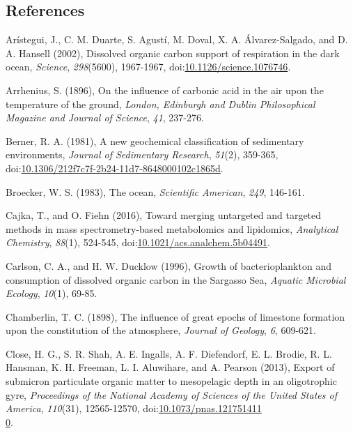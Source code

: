 \begin{singlespace}
\section*{References}
\addtocounter{section}{1}
{\setlength{\parindent}{0pt}
Ar\'{i}stegui, J., C. M. Duarte, S. Agust\'{i}, M. Doval, X. A. \'{A}lvarez-Salgado,
and D. A. Hansell (2002), Dissolved organic carbon support of
respiration in the dark ocean, \emph{Science}, \emph{298}(5600),
1967-1967, doi:\href{http://dx.doi.org/10.1126/science.1076746}{10.1126/science.1076746}.

{\setlength{\parskip}{10pt}

Arrhenius, S. (1896), On the influence of carbonic acid in the air upon the temperature of the ground, \emph{London, Edinburgh and Dublin Philosophical Magazine and Journal of Science}, \emph{41}, 237-276.

Berner, R. A. (1981), A new geochemical classification of sedimentary
environments, \emph{Journal of Sedimentary Research}, \emph{51}(2),
359-365, doi:\href{http://dx.doi.org/10.1306/212f7c7f-2b24-11d7-8648000102c1865d}{10.1306/212f7c7f-2b24-11d7-8648000102c1865d}.

Broecker, W. S. (1983), The ocean, \emph{Scientific American}, \emph{249}, 146-161.

Cajka, T., and O. Fiehn (2016), Toward merging untargeted and targeted
methods in mass spectrometry-based metabolomics and lipidomics,
\emph{Analytical Chemistry}, \emph{88}(1), 524-545,
doi:\href{http://dx.doi.org/10.1021/acs.analchem.5b04491}{10.1021/acs.analchem.5b04491}.

Carlson, C. A., and H. W. Ducklow (1996), Growth of bacterioplankton and
consumption of dissolved organic carbon in the Sargasso Sea,
\emph{Aquatic Microbial Ecology}, \emph{10}(1), 69-85.

Chamberlin, T. C. (1898), The influence of great epochs of limestone formation upon the constitution of the atmosphere, \emph{Journal of Geology}, \emph{6}, 609-621.

Close, H. G., S. R. Shah, A. E. Ingalls, A. F. Diefendorf, E. L. Brodie,
R. L. Hansman, K. H. Freeman, L. I. Aluwihare, and A. Pearson (2013),
Export of submicron particulate organic matter to mesopelagic depth in
an oligotrophic gyre, \emph{Proceedings of the National Academy of Sciences of the United States of America}, \emph{110}(31),
12565-12570, doi:\href{http://dx.doi.org/10.1073/pnas.1217514110}{10.1073/pnas.121751411\\0}.

}}
\end{singlespace}
